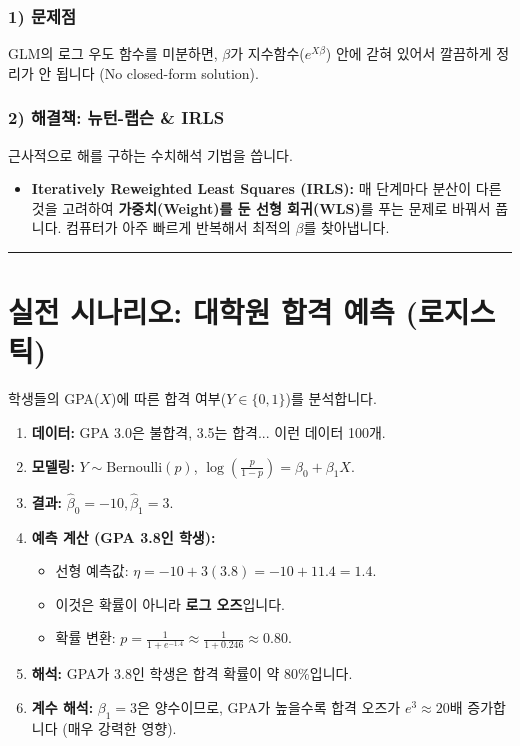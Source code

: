 \documentclass[11pt,a4paper]{book}
\theoremstyle{definition}
\begin{document}
\subsubsection*{1) 문제점}
GLM의 로그 우도 함수를 미분하면, $\beta$가 지수함수($e^{X\beta}$) 안에 갇혀 있어서 깔끔하게 정리가 안 됩니다 (No closed-form solution).

\subsubsection*{2) 해결책: 뉴턴-랩슨 \& IRLS}
근사적으로 해를 구하는 수치해석 기법을 씁니다.
\begin{itemize}
    \item \textbf{Iteratively Reweighted Least Squares (IRLS):}
    매 단계마다 분산이 다른 것을 고려하여 \textbf{가중치(Weight)를 둔 선형 회귀(WLS)}를 푸는 문제로 바꿔서 풉니다. 컴퓨터가 아주 빠르게 반복해서 최적의 $\beta$를 찾아냅니다.
\end{itemize}

\vspace{0.5cm}\hrule\vspace{0.5cm}

\section{실전 시나리오: 대학원 합격 예측 (로지스틱)}

\begin{storybox}[title={Scenario: GPA와 합격률의 관계}]
학생들의 GPA($X$)에 따른 합격 여부($Y \in \{0, 1\}$)를 분석합니다.
\end{storybox}

\begin{enumerate}
    \item \textbf{데이터:} GPA 3.0은 불합격, 3.5는 합격... 이런 데이터 100개.
    \item \textbf{모델링:} $Y \sim \text{Bernoulli}(p)$, $\log(\frac{p}{1-p}) = \beta_0 + \beta_1 X$.
    \item \textbf{결과:} $\hat{\beta}_0 = -10, \hat{\beta}_1 = 3$.
    \item \textbf{예측 계산 (GPA 3.8인 학생):}
    \begin{itemize}
        \item 선형 예측값: $\eta = -10 + 3(3.8) = -10 + 11.4 = 1.4$.
        \item 이것은 확률이 아니라 \textbf{로그 오즈}입니다.
        \item 확률 변환: $p = \frac{1}{1 + e^{-1.4}} \approx \frac{1}{1 + 0.246} \approx 0.80$.
    \end{itemize}
    \item \textbf{해석:} GPA가 3.8인 학생은 합격 확률이 약 80\%입니다.
    \item \textbf{계수 해석:} $\beta_1=3$은 양수이므로, GPA가 높을수록 합격 오즈가 $e^3 \approx 20$배 증가합니다 (매우 강력한 영향).
\end{enumerate}
\end{document}
